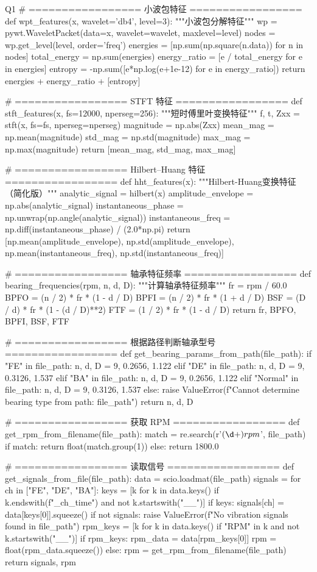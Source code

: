 \begin{Python}{Q1}
# ================= 小波包特征 =================
def wpt_features(x, wavelet='db4', level=3):
    """小波包分解特征"""
    wp = pywt.WaveletPacket(data=x, wavelet=wavelet, maxlevel=level)
    nodes = wp.get_level(level, order='freq')
    energies = [np.sum(np.square(n.data)) for n in nodes]
    total_energy = np.sum(energies)
    energy_ratio = [e / total_energy for e in energies]
    entropy = -np.sum([e*np.log(e+1e-12) for e in energy_ratio])
    return energies + energy_ratio + [entropy]

# ================= STFT 特征 =================
def stft_features(x, fs=12000, nperseg=256):
    """短时傅里叶变换特征"""
    f, t, Zxx = stft(x, fs=fs, nperseg=nperseg)
    magnitude = np.abs(Zxx)
    mean_mag = np.mean(magnitude)
    std_mag = np.std(magnitude)
    max_mag = np.max(magnitude)
    return [mean_mag, std_mag, max_mag]

# ================= Hilbert–Huang 特征 =================
def hht_features(x):
    """Hilbert-Huang变换特征（简化版）"""
    analytic_signal = hilbert(x)
    amplitude_envelope = np.abs(analytic_signal)
    instantaneous_phase = np.unwrap(np.angle(analytic_signal))
    instantaneous_freq = np.diff(instantaneous_phase) / (2.0*np.pi)
    return [np.mean(amplitude_envelope), np.std(amplitude_envelope),
            np.mean(instantaneous_freq), np.std(instantaneous_freq)]

# ================= 轴承特征频率 =================
def bearing_frequencies(rpm, n, d, D):
    """计算轴承特征频率"""
    fr = rpm / 60.0
    BPFO = (n / 2) * fr * (1 - d / D)
    BPFI = (n / 2) * fr * (1 + d / D)
    BSF = (D / d) * fr * (1 - (d / D)**2)
    FTF = (1 / 2) * fr * (1 - d / D)
    return fr, BPFO, BPFI, BSF, FTF

# ================= 根据路径判断轴承型号 =================
def get_bearing_params_from_path(file_path):
    if "FE" in file_path:
        n, d, D = 9, 0.2656, 1.122
    elif "DE" in file_path:
        n, d, D = 9, 0.3126, 1.537
    elif "BA" in file_path:
        n, d, D = 9, 0.2656, 1.122
    elif "Normal" in file_path:
        n, d, D = 9, 0.3126, 1.537
    else:
        raise ValueError(f"Cannot determine bearing type from path: {file_path}")
    return n, d, D

# ================= 获取 RPM =================
def get_rpm_from_filename(file_path):
    match = re.search(r'\((\d+)rpm\)', file_path)
    if match:
        return float(match.group(1))
    else:
        return 1800.0

# ================= 读取信号 =================
def get_signals_from_file(file_path):
    data = scio.loadmat(file_path)
    signals = {}
    for ch in ["FE", "DE", "BA"]:
        keys = [k for k in data.keys() if k.endswith(f"_{ch}_time") and not k.startswith("__")]
        if keys:
            signals[ch] = data[keys[0]].squeeze()
    if not signals:
        raise ValueError(f"No vibration signals found in {file_path}")
    rpm_keys = [k for k in data.keys() if "RPM" in k and not k.startswith("__")]
    if rpm_keys:
        rpm_data = data[rpm_keys[0]]
        rpm = float(rpm_data.squeeze())
    else:
        rpm = get_rpm_from_filename(file_path)
    return signals, rpm


\end{Python}
